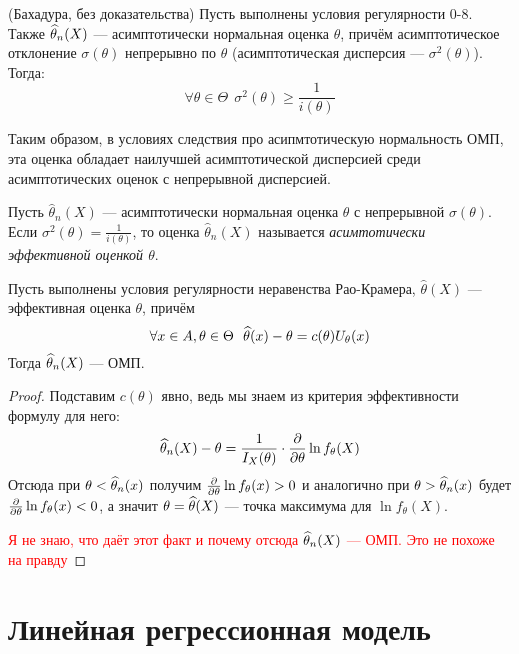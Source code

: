 \begin{theorem} (Бахадура, без доказательства)
	Пусть выполнены условия регулярности 0-8. Также $\widehat{\theta}_n(X)$ --- асимптотически нормальная оценка $\theta$, причём асимптотическое отклонение $\sigma(\theta)$ непрерывно по $\theta$ (асимптотическая дисперсия --- $\sigma^2(\theta)$). Тогда:
	\[
		\forall \theta \in \Theta\ \ \sigma^2(\theta) \ge \frac{1}{i(\theta)}
	\]
\end{theorem}

\begin{note}
	Таким образом, в условиях следствия про асипмтотическую нормальность ОМП, эта оценка обладает наилучшей асимптотической дисперсией среди асимптотических оценок с непрерывной дисперсией.
\end{note}

\begin{definition}
	Пусть $\hat{\theta}_n(X)$ --- асимптотически нормальная оценка $\theta$ с непрерывной $\sigma(\theta)$. Если $\sigma^2(\theta) = \frac{1}{i(\theta)}$, то оценка $\hat{\theta}_n(X)$ называется \textit{асимтотически эффективной оценкой $\theta$}.
\end{definition}

\begin{proposition}
	Пусть выполнены условия регулярности неравенства Рао-Крамера, $\hat{\theta}(X)$ --- эффективная оценка $\theta$, причём
	\[
		\forall x \in A, \theta \in \Theta\ \ \wh{\theta}(x) - \theta = c(\theta) U_\theta(x)
	\]
	Тогда $\widehat{\theta}_n(X)$ --- ОМП.
\end{proposition}

\begin{proof}
	Подставим $c(\theta)$ явно, ведь мы знаем из критерия эффективности формулу для него:
	\[
		\widehat{\theta}_n(X) - \theta = \frac{1}{I_X(\theta)} \cdot \frac{\partial }{\partial \theta} \ln f_\theta(X)
	\]
	Отсюда при $\theta < \widehat{\theta}_n(x)$ получим $\frac{\partial }{\partial \theta} \ln f_\theta(x) > 0$ и аналогично при $\theta > \widehat{\theta}_n(x)$ будет $\frac{\partial }{\partial \theta} \ln f_\theta(x) < 0$, а значит $\theta = \widehat{\theta}(X)$ --- точка максимума для $\ln f_\theta(X)$.
	
	\textcolor{red}{Я не знаю, что даёт этот факт и почему отсюда $\widehat{\theta}_n(X)$ --- ОМП. Это не похоже на правду}
\end{proof}

\section{Линейная регрессионная модель}

